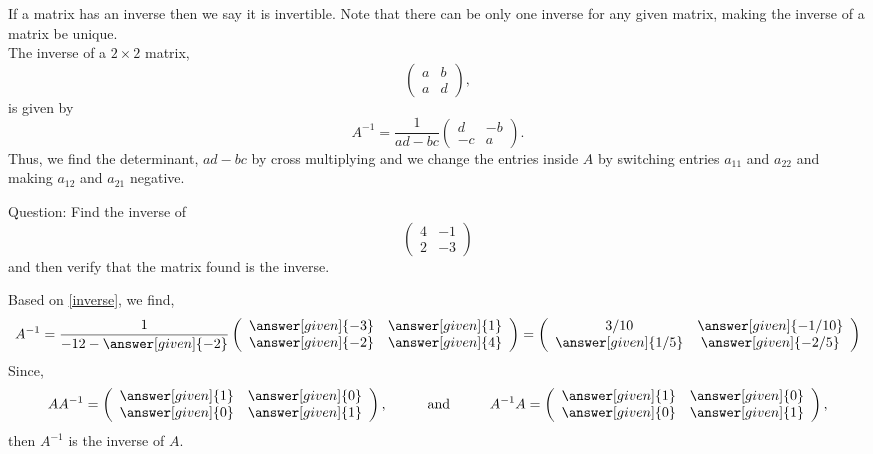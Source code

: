 \documentclass{ximera}
\begin{document}
If a matrix has an inverse then we say it is invertible. Note that there can be only one inverse for any given matrix, making the inverse of a matrix be unique. \\
The inverse of a $2\times 2$ matrix,
\[ \left(\begin{array}{cc}
  a & b  \\
  a &  d
\end{array}\right),
\]
is given by
\[
A^{-1}=  \frac{1}{ad-bc} \left(\begin{array}{cc}
  d & -b  \\
  -c &  a
\end{array}\right).
\]
Thus, we find the determinant, $ad-bc$ by cross multiplying and we change the entries inside $A$ by switching entries $a_{11}$ and $a_{22}$ and making $a_{12}$ and $a_{21}$ negative. 

Question: Find the inverse of 
\[ \left(\begin{array}{cc}
  4 & -1 \\
  2 & -3
\end{array}\right)
\]
and then verify that the matrix found is the inverse. 
\begin{prompt}
Based on \eqref{inverse}, we find,
\[
A^{-1}=  \frac{1}{-12-\answer[given]{-2}} \left(\begin{array}{cc}
  \answer[given]{-3} &  \answer[given]{1} \\
  \answer[given]{-2} &  \answer[given]{4}
\end{array}\right)= \left(\begin{array}{cc}
  3/10 &  \answer[given]{-1/10} \\
  \answer[given]{1/5} &  \answer[given]{-2/5}
\end{array}\right)
\]
Since, 
\[
AA^{-1}= \left(\begin{array}{cc}
  \answer[given]{1} &  \answer[given]{0} \\
  \answer[given]{0} &  \answer[given]{1}
\end{array}\right), \hspace{1cm} \text{and} \hspace{1cm}
A^{-1}A= \left(\begin{array}{cc}
  \answer[given]{1} &  \answer[given]{0} \\
  \answer[given]{0} &  \answer[given]{1}
\end{array}\right),
\]
then $A^{-1}$ is the inverse of $A$. 
\end{prompt}
\end{document}
